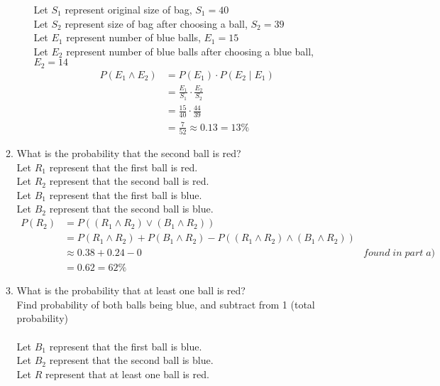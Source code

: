 \documentclass{article}
\begin{document}
\begin{enumerate}
\begin{enumerate}
\begin{itemize}
Let $S_{1}$ represent original size of bag, $S_{1} = 40$\\
Let $S_{2}$ represent size of bag after choosing a ball, $S_{2} = 39$\\
Let $E_{1}$ represent number of blue balls, $E_{1} = 15$\\
Let $E_{2}$ represent number of blue balls after choosing a blue ball, $E_{2} = 14$\\
\begin {align}
P(E_{1} \land E_{2}) &= P(E_{1}) \cdot P(E_{2} \mid E_{1})\\
&= \frac{E_{1}}{S_{1}} \cdot \frac{E_{2}}{S_{2}}\\
&= \frac{15}{40} \cdot \frac{44}{39}\\
&= \frac{7}{52} \approx 0.13 = 13\%
\end {align}
\end{itemize}

\item What is the probability that the second  ball is red?\\

Let $R_{1}$ represent that the first ball is red.\\
Let $R_{2}$ represent that the second ball is red.\\
Let $B_{1}$ represent that the first ball is blue.\\
Let $B_{2}$ represent that the second ball is blue.\\

\begin {align}
P(R_{2}) &= P((R_{1} \land R_{2}) \lor (B_{1} \land R_{2}))\\
&= P(R_{1} \land R_{2}) + P(B_{1} \land R_{2}) - P((R_{1} \land R_{2}) \land (B_{1} \land R_{2}))\\
&\approx 0.38 + 0.24 - 0 &found\;in\;part\;a)\\
&= 0.62 = 62\%
\end {align}

\item  What is the probability that at least one ball is red?\\

Find probability of both balls being blue, and subtract from 1 (total probability)\\\\
Let $B_{1}$ represent that the first ball is blue.\\
Let $B_{2}$ represent that the second ball is blue.\\
Let $R$ represent that at least one ball is red.\\


\end{enumerate}
\end{enumerate}
\end{document}
